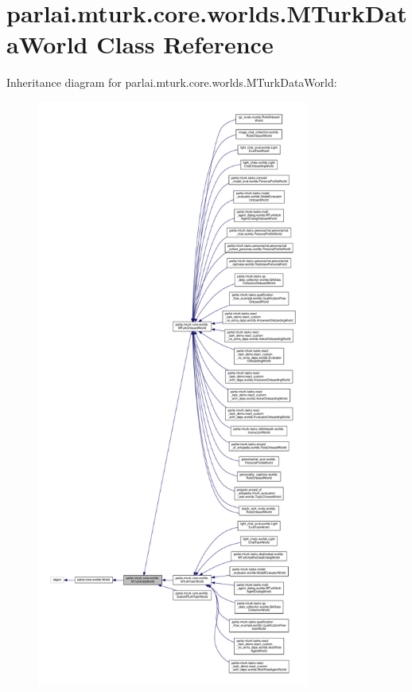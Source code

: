 \hypertarget{classparlai_1_1mturk_1_1core_1_1worlds_1_1MTurkDataWorld}{}\section{parlai.\+mturk.\+core.\+worlds.\+M\+Turk\+Data\+World Class Reference}
\label{classparlai_1_1mturk_1_1core_1_1worlds_1_1MTurkDataWorld}


Inheritance diagram for parlai.\+mturk.\+core.\+worlds.\+M\+Turk\+Data\+World\+:
\nopagebreak
\begin{figure}[H]
\begin{center}
\leavevmode
\includegraphics[height=550pt]{db/dd2/classparlai_1_1mturk_1_1core_1_1worlds_1_1MTurkDataWorld__inherit__graph}
\end{center}
\end{figure}


